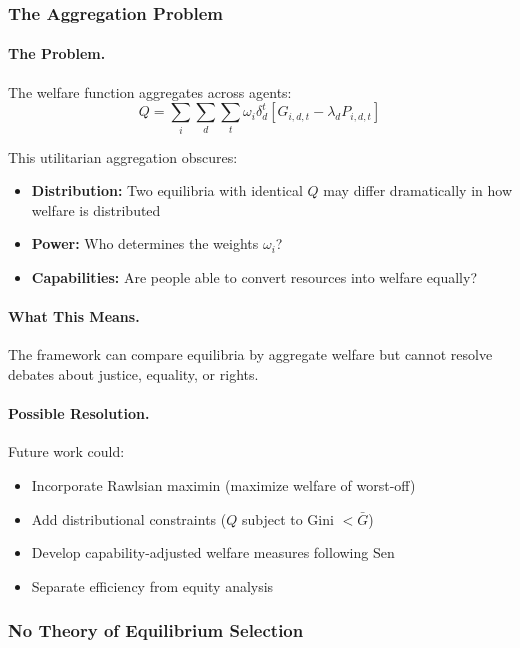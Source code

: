 \subsubsection{The Aggregation Problem}

\paragraph{The Problem.}
The welfare function aggregates across agents:
\begin{equation}
  Q = \sum_i \sum_d \sum_t \omega_i \delta_d^t [G_{i,d,t} - \lambda_d P_{i,d,t}]
\end{equation}

This utilitarian aggregation obscures:
\begin{itemize}
  \item \textbf{Distribution:} Two equilibria with identical $Q$ may differ dramatically 
        in how welfare is distributed
  \item \textbf{Power:} Who determines the weights $\omega_i$?
  \item \textbf{Capabilities:} Are people able to convert resources into welfare equally?
\end{itemize}

\paragraph{What This Means.}
The framework can compare equilibria by aggregate welfare
but cannot resolve debates about justice, equality, or rights.

\paragraph{Possible Resolution.}
Future work could:
\begin{itemize}
  \item Incorporate Rawlsian maximin (maximize welfare of worst-off)
  \item Add distributional constraints ($Q$ subject to Gini $< \bar{G}$)
  \item Develop capability-adjusted welfare measures following Sen
  \item Separate efficiency from equity analysis
\end{itemize}

\subsubsection{No Theory of Equilibrium Selection}

